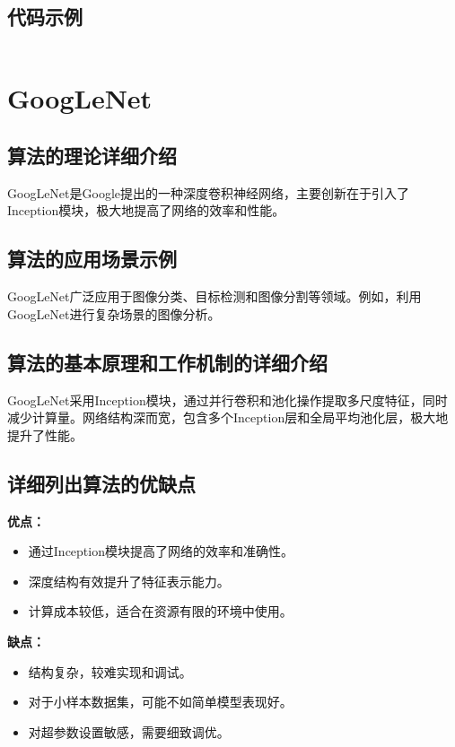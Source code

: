\subsection*{代码示例}
\begin{lstlisting}

\end{lstlisting}


\section{GoogLeNet}
\subsection*{算法的理论详细介绍}
GoogLeNet是Google提出的一种深度卷积神经网络，主要创新在于引入了Inception模块，极大地提高了网络的效率和性能。

\subsection*{算法的应用场景示例}
GoogLeNet广泛应用于图像分类、目标检测和图像分割等领域。例如，利用GoogLeNet进行复杂场景的图像分析。

\subsection*{算法的基本原理和工作机制的详细介绍}
GoogLeNet采用Inception模块，通过并行卷积和池化操作提取多尺度特征，同时减少计算量。网络结构深而宽，包含多个Inception层和全局平均池化层，极大地提升了性能。

\subsection*{详细列出算法的优缺点}
\textbf{优点：}
\begin{itemize}
    \item 通过Inception模块提高了网络的效率和准确性。
    \item 深度结构有效提升了特征表示能力。
    \item 计算成本较低，适合在资源有限的环境中使用。
\end{itemize}

\textbf{缺点：}
\begin{itemize}
    \item 结构复杂，较难实现和调试。
    \item 对于小样本数据集，可能不如简单模型表现好。
    \item 对超参数设置敏感，需要细致调优。
\end{itemize}

